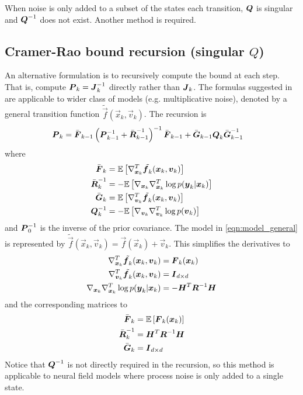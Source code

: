 \documentclass{article}
\begin{document}
When noise is only added to a subset of the states each transition, $\boldsymbol{Q}$ is singular and $\boldsymbol{Q}^{-1}$ does not exist. Another method is required.

\subsection{Cramer-Rao bound recursion (singular $Q$)} 

An alternative formulation is to recursively compute the bound at each step. That is, compute $\boldsymbol{P}_k = \boldsymbol{J}_k^{-1}$ directly rather than $\boldsymbol{J}_k$. The formulas suggested in \cite{Bergman2001} are applicable to wider class of models (e.g. multiplicative noise), denoted by a general transition function $\tilde{\vec f}(\vec x_k,\vec v_k)$. The recursion is
\begin{align}
	\boldsymbol{P}_k &= \bar{\boldsymbol{F}}_{k-1}\left(\boldsymbol{P}_{k-1}^{-1} + \bar{\boldsymbol{R}}_{k-1}^{-1}\right)^{-1}\bar{\boldsymbol{F}}_{k-1} + \bar{\boldsymbol{G}}_{k-1}\boldsymbol{Q}_k \bar{\boldsymbol{G}}_{k-1}^{-1}
\end{align}
where
\begin{align}
	\bar{\boldsymbol{F}}_k &= \mathbb E \left[ \nabla_{{\boldsymbol x}_k}^T \tilde{{\boldsymbol f}_k}({\boldsymbol x}_k,{\boldsymbol v}_k)\right] \\
	\bar{\boldsymbol{R}}_k^{-1} &= -\mathbb E\left[ \nabla_{{\boldsymbol x}_k}\nabla_{{\boldsymbol x}_k}^T \log p({\boldsymbol y}_k|{\boldsymbol x}_k) \right] \\
	\bar{\boldsymbol{G}}_k &= \mathbb E \left[ \nabla_{{\boldsymbol v}_k}^T \tilde{{\boldsymbol f}_k}({\boldsymbol x}_k,{\boldsymbol v}_k)\right] \\
	\boldsymbol{Q}_k^{-1} &= -\mathbb E \left[ \nabla_{{\boldsymbol v}_k}\nabla_{{\boldsymbol v}_k}^T \log p({\boldsymbol v}_k) \right]
\end{align}
and $\boldsymbol{P}_0^{-1}$ is the inverse of the prior covariance. The model in \eqref{eqn:model_general} is represented by $\tilde{\vec f}(\vec x_k,\vec v_k) = \vec f(\vec x_k) + \vec v_k$. This simplifies the derivatives to
\begin{align}
	\nabla_{{\boldsymbol x}_k}^T \tilde{{\boldsymbol f}_k}({\boldsymbol x}_k,{\boldsymbol v}_k) &= \boldsymbol{F}_k({\boldsymbol x}_k) \\
	\nabla_{{\boldsymbol v}_k}^T \tilde{{\boldsymbol f}_k}({\boldsymbol x}_k,{\boldsymbol v}_k) &= \boldsymbol{I}_{d\times d} \\
	\nabla_{{\boldsymbol x}_k}\nabla_{{\boldsymbol x}_k}^T \log p({\boldsymbol y}_k|{\boldsymbol x}_k) &= -\boldsymbol{H}^T\boldsymbol{R}^{-1} \boldsymbol{H} 
\end{align}
and the corresponding matrices to	
\begin{align}
	\bar{\boldsymbol{F}}_k &= \mathbb E\left[ \boldsymbol{F}_k({\boldsymbol x}_k)\right] \label{eqn:pcrb_term_F}\\
	\bar{\boldsymbol{R}}_k^{-1} &= \boldsymbol{H}^T\boldsymbol{R}^{-1} \boldsymbol{H} \\
	\bar{\boldsymbol{G}}_k &= \boldsymbol{I}_{d\times d} 
\end{align}
Notice that $\boldsymbol{Q}^{-1}$ is not directly required in the recursion, so this method is applicable to neural field models where process noise is only added to a single state.
\end{document}
